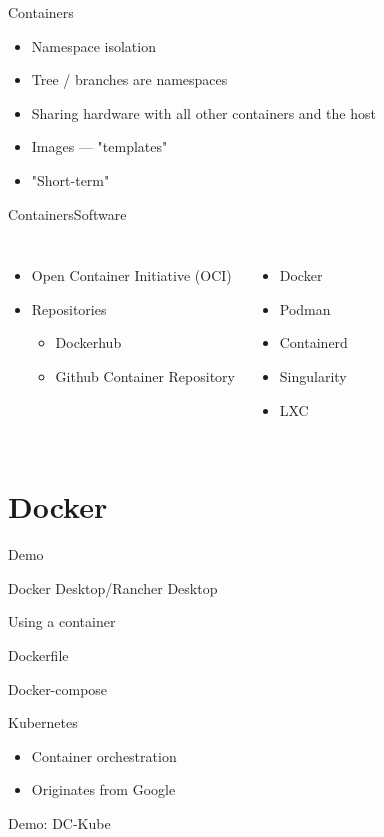 \documentclass{dcpresentation}
\begin{document}
 \begin{frame}{Containers}
  \begin{itemize}
   \item Namespace isolation
   \item Tree / branches are namespaces
   \item Sharing hardware with all other containers and the host
   \item Images --- "templates"
   \item "Short-term"
  \end{itemize}
 \end{frame}
 
 \begin{frame}{Containers}{Software}
  \begin{columns}
    \begin{itemize}
     \item Open Container Initiative (OCI)
     \item Repositories
     \begin{itemize}
      \item Dockerhub
      \item Github Container Repository   
     \end{itemize}
    \end{itemize}
    \begin{itemize}
     \item Docker
     \item Podman
     \item Containerd
     \item Singularity
     \item LXC
    \end{itemize}
  \end{columns}
 \end{frame}

 \section{Docker}

 \begin{frame}
  \begin{center}
   \alert{\Large Demo}
   \vspace{7pt}

   \alert{Docker Desktop/Rancher Desktop}
   
   \alert{Using a container}
   
   \alert{Dockerfile}
   
   \alert{Docker-compose}
  \end{center}
 \end{frame}

 \begin{frame}{Kubernetes}
  \begin{itemize}
   \item Container orchestration
   \item Originates from Google
  \end{itemize}
 \end{frame}  

 \begin{frame}
  \centering \alert{Demo: DC-Kube}
 \end{frame}
\end{document}
